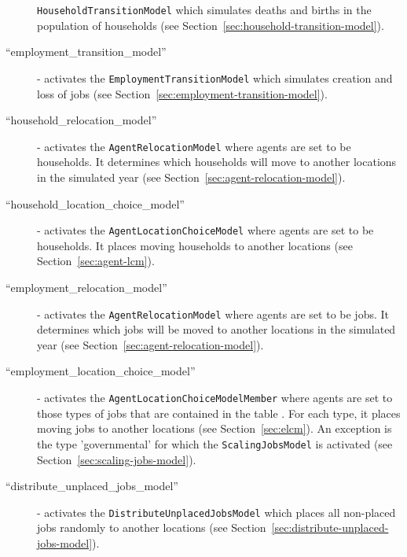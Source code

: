\begin{description}
  \verb|HouseholdTransitionModel| \modelsindex which simulates deaths and births in the
  population of households (see Section~\ref{sec:household-transition-model}).
  \item[``employment_transition_model''] \modelsindex - activates the
  \verb|EmploymentTransitionModel| \modelsindex which simulates creation and loss of jobs
  (see Section~\ref{sec:employment-transition-model}).
  \item[``household_relocation_model''] \modelsindex - activates the
  \verb|AgentRelocationModel| \modelsindex where agents are set to be households. It
  determines which households will move to another locations in the simulated
  year (see Section~\ref{sec:agent-relocation-model}).
  \item[``household_location_choice_model''] \modelsindex - activates the
  \verb|AgentLocationChoiceModel| \modelsindex where agents are set to be households. It
  places moving households to another locations (see
  Section~\ref{sec:agent-lcm}).
  \item[``employment_relocation_model''] \modelsindex - activates the
  \verb|AgentRelocationModel| \modelsindex where agents are set to be jobs. It determines
  which jobs will be moved to another locations in the simulated year (see
  Section~\ref{sec:agent-relocation-model}).
  \item[``employment_location_choice_model''] \modelsindex - activates the
  \verb|AgentLocationChoiceModelMember| \modelsindex where agents are set to those types of jobs
  that are contained in the table .
  For each type, it places moving jobs to another locations (see
  Section~\ref{sec:elcm}). An exception is the type 'governmental' for which the \verb|ScalingJobsModel| is activated
  (see Section~\ref{sec:scaling-jobs-model}).
  \item[``distribute_unplaced_jobs_model''] \modelsindex - activates the \verb|DistributeUnplacedJobsModel| \modelsindex which
  places  all non-placed jobs randomly to another locations (see Section~\ref{sec:distribute-unplaced-jobs-model}).
\end{description}

